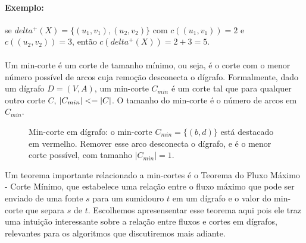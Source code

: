 \documentclass[12pt,a4paper]{article}
\def\\{}%
\def\leq{\string<=}%
\def\delta{delta}%
\begin{document}
\paragraph{Exemplo:} se \(\delta^+(X)=\{(u_1,v_1),(u_2,v_2)\}\) com \(c((u_1,v_1))=2\) e \(c((u_2,v_2))=3\), então \(c(\delta^+(X))=2+3=5\).

\paragraph{}
Um min-corte é um corte de tamanho mínimo, ou seja, é o corte com o menor número possível de arcos cuja remoção desconecta o dígrafo. Formalmente, dado um dígrafo \(D = (V, A)\), um min-corte \(C_{min}\) é um corte tal que para qualquer outro corte \(C\), \(|C_{min}| \leq |C|\). O tamanho do min-corte é o número de arcos em \(C_{min}\).

\begin{figure}[H]
\centering
{}
\caption{Min-corte em dígrafo: o min-corte $C_{min}=\{(b,d)\}$ está destacado em vermelho. Remover esse arco desconecta o dígrafo, e é o menor corte possível, com tamanho $|C_{min}|=1$.}
\label{fig:min-corte}
\end{figure}

Um teorema importante relacionado a min-cortes é o Teorema do Fluxo Máximo - Corte Mínimo, que estabelece uma relação entre o fluxo máximo que pode ser enviado de uma fonte \(s\) para um sumidouro \(t\) em um dígrafo e o valor do min-corte que separa \(s\) de \(t\). Escolhemos apresensentar esse teorema aqui pois ele traz uma intuição interessante sobre a relação entre fluxos e cortes em dígrafos, relevantes para os algoritmos que discutiremos mais adiante.
\end{document}
